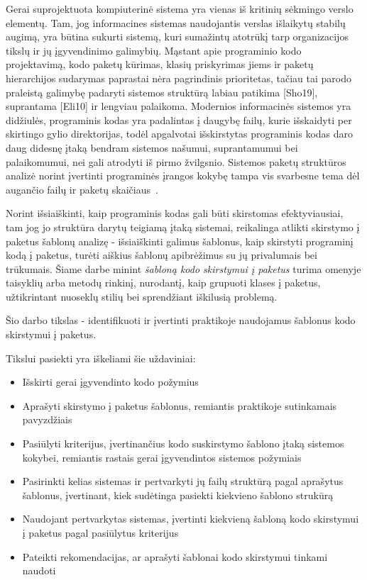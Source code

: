 Gerai suprojektuota kompiuterinė sistema yra vienas iš kritinių sėkmingo verslo
elementų.
Tam, jog informacines sistemas naudojantis verslas išlaikytų stabilų augimą, yra būtina sukurti sistemą, kuri sumažintų
atotrūkį tarp organizacijos tikslų ir jų įgyvendinimo galimybių.
Mąstant apie programinio kodo
projektavimą, kodo paketų kūrimas, klasių priskyrimas jiems ir paketų hierarchijos sudarymas paprastai
nėra pagrindinis prioritetas, tačiau tai parodo praleistą galimybę padaryti sistemos struktūrą labiau
patikima [Sho19], suprantama [Eli10] ir lengviau palaikoma.
Modernios informacinės sistemos yra didžiulės, programinis kodas yra padalintas į daugybę failų,
kurie išskaidyti per skirtingo gylio direktorijas, todėl apgalvotai išskirstytas programinis
kodas daro daug didesnę įtaką bendram sistemos našumui, suprantamumui bei palaikomumui, nei gali atrodyti iš pirmo žvilgsnio.
Sistemos paketų struktūros analizė norint įvertinti programinės įrangos kokybę
tampa vis svarbesne tema dėl augančio failų ir paketų skaičiaus~\cite{DesignMetrics}.

Norint išsiaiškinti, kaip programinis kodas gali būti skirstomas efektyviausiai,
tam jog jo struktūra darytų teigiamą įtaką sistemai, reikalinga atlikti skirstymo į paketus šablonų analizę -
išsiaiškinti galimus šablonus, kaip skirstyti programinį kodą į paketus, turėti aiškius šablonų apibrėžimus su jų
privalumais bei trūkumais.
Šiame darbe minint \textit{šabloną kodo skirstymui į paketus} turima omenyje taisyklių arba metodų rinkinį,
nurodantį, kaip grupuoti klases į paketus, užtikrintant nuoseklų stilių bei sprendžiant iškilusią problemą.

Šio darbo tikslas - identifikuoti ir įvertinti praktikoje naudojamus šablonus kodo skirstymui į paketus.

Tikslui pasiekti yra iškeliami šie uždaviniai:
\begin{itemize}
    \item  Išskirti gerai įgyvendinto kodo požymius
    \item  Aprašyti skirstymo į paketus šablonus, remiantis praktikoje sutinkamais pavyzdžiais
    \item  Pasiūlyti kriterijus, įvertinančius kodo suskirstymo šablono įtaką sistemos kokybei, remiantis
rastais gerai įgyvendintos sistemos požymiais
    \item  Pasirinkti kelias sistemas ir pertvarkyti jų failų struktūrą pagal aprašytus šablonus, įvertinant,
kiek sudėtinga pasiekti kiekvieno šablono strukūrą
    \item  Naudojant pertvarkytas sistemas, įvertinti kiekvieną šabloną kodo skirstymui į paketus pagal pasiūlytus kriterijus
    \item  Pateikti rekomendacijas, ar aprašyti šablonai kodo skirstymui tinkami naudoti
\end{itemize}


